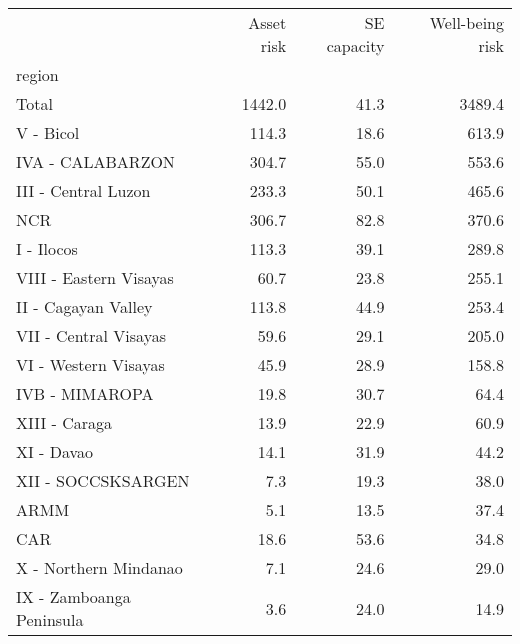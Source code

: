 \begin{tabular}{lrrr}
\toprule
{} &  Asset risk &  SE capacity &  Well-being risk \\
region                   &             &              &                  \\
\midrule
Total                    &      1442.0 &         41.3 &           3489.4 \\
V - Bicol                &       114.3 &         18.6 &            613.9 \\
IVA - CALABARZON         &       304.7 &         55.0 &            553.6 \\
III - Central Luzon      &       233.3 &         50.1 &            465.6 \\
NCR                      &       306.7 &         82.8 &            370.6 \\
I - Ilocos               &       113.3 &         39.1 &            289.8 \\
VIII - Eastern Visayas   &        60.7 &         23.8 &            255.1 \\
II - Cagayan Valley      &       113.8 &         44.9 &            253.4 \\
VII - Central Visayas    &        59.6 &         29.1 &            205.0 \\
VI - Western Visayas     &        45.9 &         28.9 &            158.8 \\
IVB - MIMAROPA           &        19.8 &         30.7 &             64.4 \\
XIII - Caraga            &        13.9 &         22.9 &             60.9 \\
XI - Davao               &        14.1 &         31.9 &             44.2 \\
XII - SOCCSKSARGEN       &         7.3 &         19.3 &             38.0 \\
ARMM                     &         5.1 &         13.5 &             37.4 \\
CAR                      &        18.6 &         53.6 &             34.8 \\
X - Northern Mindanao    &         7.1 &         24.6 &             29.0 \\
IX - Zamboanga Peninsula &         3.6 &         24.0 &             14.9 \\
\bottomrule
\end{tabular}
